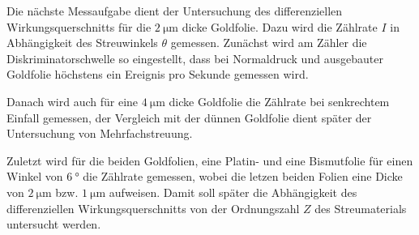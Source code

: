 Die nächste Messaufgabe dient der Untersuchung des differenziellen Wirkungsquerschnitts für die $\SI{2}{\micro\meter}$ dicke Goldfolie. Dazu wird die Zählrate $I$ in Abhängigkeit des Streuwinkels $\theta$ gemessen. Zunächst wird am Zähler die Diskriminatorschwelle so eingestellt, dass bei Normaldruck und ausgebauter Goldfolie höchstens ein Ereignis pro Sekunde gemessen wird.

Danach wird auch für eine $\SI{4}{\micro\meter}$ dicke Goldfolie die Zählrate bei senkrechtem Einfall gemessen, der Vergleich mit der dünnen Goldfolie dient später der Untersuchung von Mehrfachstreuung.

Zuletzt wird für die beiden Goldfolien, eine Platin- und eine Bismutfolie für einen Winkel von $\SI{6}{\degree}$ die Zählrate gemessen, wobei die letzen beiden Folien eine Dicke von $\SI{2}{\micro\meter}$ bzw. $\SI{1}{\micro\meter}$ aufweisen. Damit soll später die Abhängigkeit des differenziellen Wirkungsquerschnitts von der Ordnungszahl $Z$ des Streumaterials untersucht werden.
